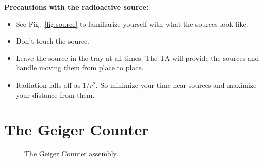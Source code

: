 \noindent
{\bf Precautions with the radioactive source:}
\begin{itemize}
\item See Fig.~\ref{fig:source} to familiarize yourself with what the sources look like.
\item Don't touch the source.
\item Leave the source in the tray at all times.  The TA will provide
  the sources and handle moving them from place to place.
\item Radiation falls off as $1/r^2$.  So minimize your time near
  sources and maximize your distance from them.
\end{itemize}

\section{The Geiger Counter}

\begin{figure}[htbp]
\begin{center}
\caption{\label{fig:geigersetup} The Geiger Counter assembly.}
\end{center}
\end{figure}

